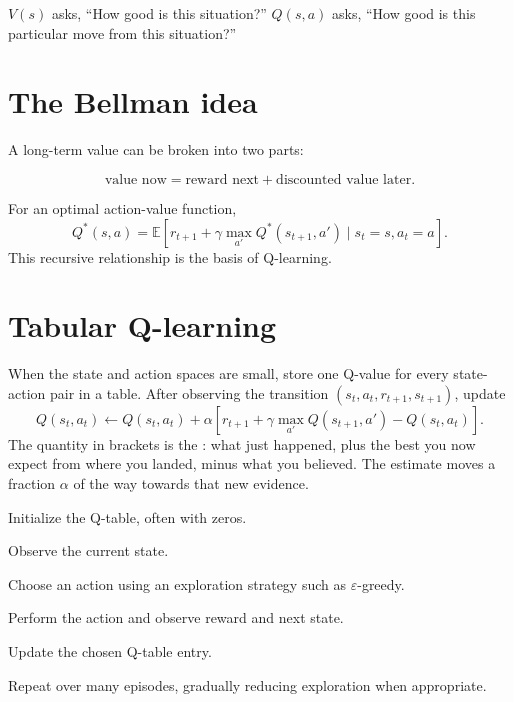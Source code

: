 \begin{intuition}
$V(s)$ asks, ``How good is this situation?'' $Q(s,a)$ asks, ``How good is this particular move from this situation?''
\end{intuition}

\section{The Bellman idea}

A long-term value can be broken into two parts:

\[
\text{value now}=\text{reward next}+\text{discounted value later}.
\]

For an optimal action-value function,
\[
Q^*(s,a)=\mathbb{E}\left[r_{t+1}+\gamma\max_{a'}Q^*(s_{t+1},a')\mid s_t=s,a_t=a\right].
\]
This recursive relationship is the basis of Q-learning.

\section{Tabular Q-learning}

When the state and action spaces are small, store one Q-value for every state-action pair in a table. After observing the transition $(s_t,a_t,r_{t+1},s_{t+1})$, update
\[
Q(s_t,a_t)\leftarrow Q(s_t,a_t)+\alpha\left[r_{t+1}+\gamma\max_{a'}Q(s_{t+1},a')-Q(s_t,a_t)\right].
\]
The quantity in brackets is the : what just happened, plus the best you now expect from where you landed, minus what you believed. The estimate moves a fraction $\alpha$ of the way towards that new evidence.

\begin{utpsteps}
  \item Initialize the Q-table, often with zeros.
  \item Observe the current state.
  \item Choose an action using an exploration strategy such as $\varepsilon$-greedy.
  \item Perform the action and observe reward and next state.
  \item Update the chosen Q-table entry.
  \item Repeat over many episodes, gradually reducing exploration when appropriate.
\end{utpsteps}

